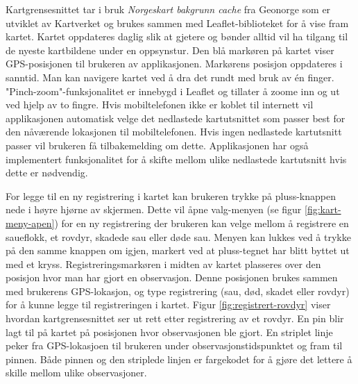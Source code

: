\noindent
Kartgrensesnittet tar i bruk \textit{Norgeskart bakgrunn cache} \cite{NorgeskartBakgrunnCache} fra Geonorge som er utviklet av Kartverket og brukes sammen med Leaflet-biblioteket \cite{LeafletJavaScriptLibrary} for å vise fram kartet. Kartet oppdateres daglig slik at gjetere og bønder alltid vil ha tilgang til de nyeste kartbildene under en oppsynstur. Den blå markøren på kartet viser GPS-posisjonen til brukeren av applikasjonen. Markørens posisjon oppdateres i sanntid. Man kan navigere kartet ved å dra det rundt med bruk av én finger. "Pinch-zoom"-funksjonalitet er innebygd i Leaflet \cite{ZoomLevelsLeaflet} og tillater å zoome inn og ut ved hjelp av to fingre. Hvis mobiltelefonen ikke er koblet til internett vil applikasjonen automatisk velge det nedlastede kartutsnittet som passer best for den nåværende lokasjonen til mobiltelefonen. Hvis ingen nedlastede kartutsnitt passer vil brukeren få tilbakemelding om dette. Applikasjonen har også implementert funksjonalitet for å skifte mellom ulike nedlastede kartutsnitt hvis dette er nødvendig.
\newline

\noindent
For legge til en ny registrering i kartet kan brukeren trykke på pluss-knappen nede i høyre hjørne av skjermen. Dette vil åpne valg-menyen (se figur \ref{fig:kart-meny-apen}) for en ny registrering der brukeren kan velge mellom å registrere en saueflokk, et rovdyr, skadede sau eller døde sau. Menyen kan lukkes ved å trykke på den samme knappen om igjen, markert ved at pluss-tegnet har blitt byttet ut med et kryss. Registreringsmarkøren i midten av kartet plasseres over den posisjon hvor man har gjort en observasjon. Denne posisjonen brukes sammen med brukerens GPS-lokasjon, og type registrering (sau, død, skadet eller rovdyr) for å kunne legge til registreringen i kartet. Figur \ref{fig:registrert-rovdyr} viser hvordan kartgrensesnittet ser ut rett etter registrering av et rovdyr. En pin blir lagt til på kartet på posisjonen hvor observasjonen ble gjort. En striplet linje peker fra GPS-lokasjoen til brukeren under observasjonstidspunktet og fram til pinnen. Både pinnen og den striplede linjen er fargekodet for å gjøre det lettere å skille mellom ulike observasjoner.

